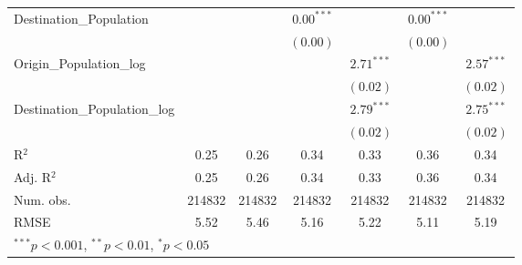 \begin{table}
\begin{center}
\begin{tabular}{l c c c c c c }
			Destination\_Population      &               &               & $0.00^{***}$  &                & $0.00^{***}$  &                \\
			&               &               & $(0.00)$      &                & $(0.00)$      &                \\
			Origin\_Population\_log      &               &               &               & $2.71^{***}$   &               & $2.57^{***}$   \\
			&               &               &               & $(0.02)$       &               & $(0.02)$       \\
			Destination\_Population\_log &               &               &               & $2.79^{***}$   &               & $2.75^{***}$   \\
			&               &               &               & $(0.02)$       &               & $(0.02)$       \\
			\hline
			R$^2$                        & 0.25          & 0.26          & 0.34          & 0.33           & 0.36          & 0.34           \\
			Adj. R$^2$                   & 0.25          & 0.26          & 0.34          & 0.33           & 0.36          & 0.34           \\
			Num. obs.                    & 214832        & 214832        & 214832        & 214832         & 214832        & 214832         \\
			RMSE                         & 5.52          & 5.46          & 5.16          & 5.22           & 5.11          & 5.19           \\
			\hline
			\multicolumn{7}{l}{\scriptsize{$^{***}p<0.001$, $^{**}p<0.01$, $^*p<0.05$}}
		\end{tabular}
		\label{table:GravityModel2016Q3}
	\end{center}
\end{table}

